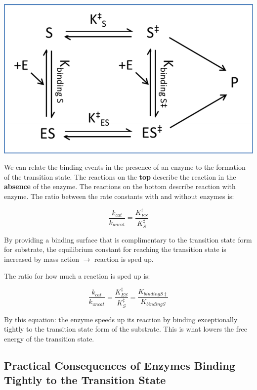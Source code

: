 \documentclass[12pt, letterpaper]{article}
\begin{document}
\begin{center}
    \includegraphics[scale = 0.5]{Kbinding.png}
\end{center}

We can relate the binding events in the presence of an enzyme to the formation of the transition state. The reactions on the \textbf{top} describe the reaction in 
the \textbf{absence} of the enzyme. The reactions on the bottom describe reaction with enzyme. The ratio between the rate constants with and without enzymes is: 

\begin{equation*}
    \frac{k_{cat}}{k_{uncat}} = \frac{K^{\ddagger}_{ES}}{K^{\ddagger}_S}
\end{equation*}

By providing a binding surface that is complimentary to the transition state form for substrate, the equilibrium constant for reaching the transition state
is increased by mass action $\rightarrow$ reaction is sped up. 

The ratio for how much a reaction is sped up is: 

\begin{equation*}
    \frac{k_{cat}}{k_{uncat}} = \frac{K^{\ddagger}_{ES}}{K^{\ddagger}_S} = \frac{K_{binding S \ddagger}}{K_{binding S}}
\end{equation*}

By this equation: the enzyme speeds up its reaction by binding exceptionally tightly to the transition state form of the substrate. 
This is what lowers the free energy of the transition state.

\newpage

\subsection*{Practical Consequences of Enzymes Binding Tightly to the Transition State}
\end{document}
